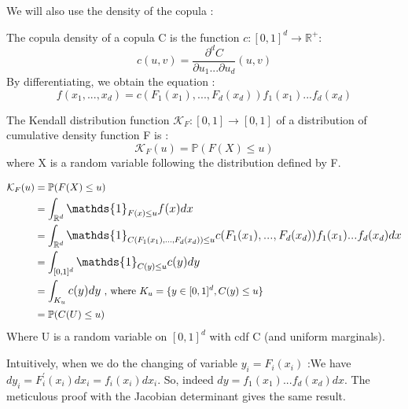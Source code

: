 \documentclass{article}
\begin{document}
	We will also use the density of the copula :
	
	\begin{definition}
	The copula density of a copula C is the function $c : [0,1]^{d}\to \mathbb{R^+}$:\newline
	\begin{equation*}
	c(u,v) = \frac{\partial^d C}{\partial u_{1} ... \partial u_{d}} (u,v)
	\end{equation*}
	\newline
	By differentiating, we obtain the equation :
	\begin{equation*}
		f(x_1,...,x_d) = c(F_1(x_1),...,F_d(x_d))f_1(x_1)...f_d(x_d)
	\end{equation*}	
	
	\end{definition}

	\begin{definition}
	The Kendall distribution function  $\mathcal{K}_F : [0,1]\to [0,1]$ of a distribution of cumulative density function F is : \newline
	\begin{equation*}
	\mathcal{K}_F (u) = \mathbb{P} (F(X) \leq u)
	\end{equation*}	
	where X is a random variable following the distribution defined by F.	
	\end{definition}
	
	
	\begin{multline*}
	\begin{split}
	\mathcal{K}_F (u)	&= \mathbb{P} (F(X) \leq u) \\
						&= \mathlarger{ \int_{\mathbb{R}^d} \mathds{1}_{F(x) \leq u}f(x) dx} \\
						&= \mathlarger{ \int_{\mathbb{R}^d} \mathds{1}_{C(F_1(x_1),...,F_d(x_d)) \leq u} c(F_1(x_1),...,F_d(x_d)) f_1(x_1)...f_d(x_d) dx} \\
						&= \mathlarger{ \int_{[0,1]^d} \mathds{1}_{C(y) \leq u} c(y) dy}\\
						&= \mathlarger{ \int_{K_u} c(y) dy} \text{	, where } K_u = \{ y\in [0,1]^d, C(y) \leq u \}\\
						&= \mathbb{P} (C(U) \leq u)
	\end{split}
	\end{multline*}
	Where U is a random variable on $[0,1]^d$ with cdf C (and uniform marginals).
	
	
	Intuitively, when we do the changing of variable $y_i=F_i(x_i)$ :\newline We have $dy_i = F_i^\prime (x_i) dx_i = f_i(x_i)dx_i$. So, indeed $dy = f_1(x_1)...f_d(x_d)dx$.\newline
	The meticulous proof with the Jacobian determinant gives the same result.
	\newline
\end{document}
